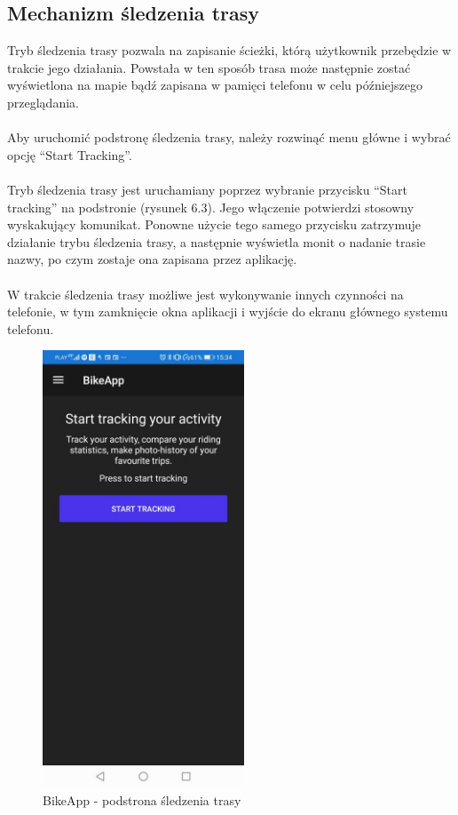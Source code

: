 \subsection{Mechanizm śledzenia trasy} %
Tryb śledzenia trasy pozwala na zapisanie ścieżki, którą użytkownik przebędzie w trakcie jego działania. Powstała w ten sposób trasa może następnie zostać wyświetlona na mapie bądź zapisana w pamięci telefonu w celu późniejszego przeglądania.\\
\\
Aby uruchomić podstronę śledzenia trasy, należy rozwinąć menu główne i wybrać opcję ``Start Tracking''.\\
\\
Tryb śledzenia trasy jest uruchamiany poprzez wybranie przycisku ``Start tracking'' na podstronie (rysunek 6.3). Jego włączenie potwierdzi stosowny wyskakujący komunikat. Ponowne użycie tego samego przycisku zatrzymuje działanie trybu śledzenia trasy, a następnie wyświetla monit o nadanie trasie nazwy, po czym zostaje ona zapisana przez aplikację.\\
\\
W trakcie śledzenia trasy możliwe jest wykonywanie innych czynności na telefonie, w tym zamknięcie okna aplikacji i wyjście do ekranu głównego systemu telefonu.

\begin{figure}[!htb]
	\begin{center}
		\includegraphics[width=6cm]{rys/instructions-tracking.jpg}
		\caption{BikeApp - podstrona śledzenia trasy}
		\label{rys:BikeApp - podstrona śledzenia trasy}
	\end{center}
\end{figure}

